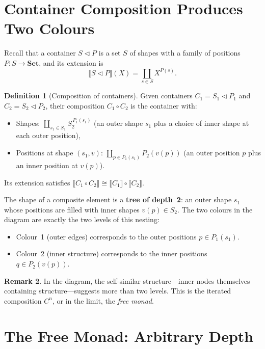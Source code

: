 \documentclass[11pt,a4paper]{article}
\theoremstyle{definition}
\newtheorem{definition}{Definition}[section]
\newtheorem{remark}[definition]{Remark}
\theoremstyle{plain}
\newcommand{\Set}{\mathbf{Set}}
\newcommand{\cont}[2]{#1 \triangleleft #2}
\newcommand{\Ext}[1]{\llbracket #1 \rrbracket}
\begin{document}
\section{Container Composition Produces Two Colours}

Recall that a container $\cont{S}{P}$ is a set $S$ of shapes with a
family of positions $P : S \to \Set$, and its extension is
\[
\Ext{\cont{S}{P}}(X) = \coprod_{s \in S} X^{P(s)}.
\]

\begin{definition}[Composition of containers]
Given containers $C_1 = \cont{S_1}{P_1}$ and $C_2 = \cont{S_2}{P_2}$,
their composition $C_1 \circ C_2$ is the container with:
\begin{itemize}[nosep]
\item Shapes: $\displaystyle \coprod_{s_1 \in S_1}
  S_2^{\,P_1(s_1)}$
  \quad (an outer shape $s_1$ plus a choice of inner shape at each outer
  position),
\item Positions at shape $(s_1, v)$: $\displaystyle \coprod_{p \in P_1(s_1)}
  P_2(v(p))$
  \quad (an outer position $p$ plus an inner position at $v(p)$).
\end{itemize}
Its extension satisfies
$\Ext{C_1 \circ C_2} \cong \Ext{C_1} \circ \Ext{C_2}$.
\end{definition}

The shape of a composite element is a \textbf{tree of depth~2}: an outer
shape $s_1$ whose positions are filled with inner shapes $v(p) \in S_2$.
The two colours in the diagram are exactly the two levels of this
nesting:
\begin{itemize}[nosep]
\item Colour~1 (outer edges) corresponds to the outer positions $p \in P_1(s_1)$.
\item Colour~2 (inner structure) corresponds to the inner positions
  $q \in P_2(v(p))$.
\end{itemize}

\begin{remark}
In the diagram, the self-similar structure---inner nodes themselves
containing structure---suggests more than two levels. This is the
iterated composition $C^n$, or in the limit, the \emph{free monad}.
\end{remark}

\section{The Free Monad: Arbitrary Depth}
\end{document}
